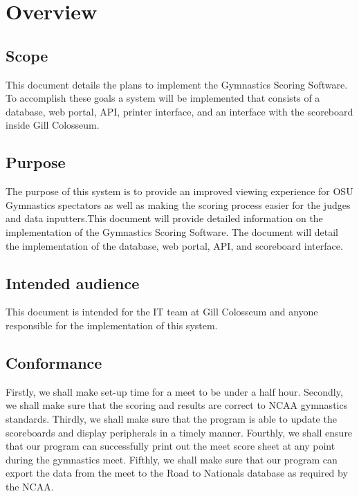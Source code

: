 \documentclass[letterpaper,10pt,draftclsnofoot,onecolumn,]{article}
\begin{document}
\section{Overview}
\subsection{Scope}
This document details the plans to implement the Gymnastics Scoring Software. To accomplish these goals a system will be implemented that consists of a database, web portal, API, printer interface, and an interface with the scoreboard inside Gill Colosseum. 
\subsection{Purpose}
The purpose of this system is to provide an improved viewing experience for OSU Gymnastics spectators as well as making the scoring process easier for the judges and data inputters.This document will provide detailed information on the implementation of the Gymnastics Scoring Software. The document will detail the implementation of the database, web portal, API, and scoreboard interface. 
\subsection{Intended audience}
This document is intended for the IT team at Gill Colosseum and anyone responsible for the implementation of this system. 

\subsection{Conformance}
Firstly, we shall make set-up time for a meet to be under a half hour. Secondly, we shall make sure that the scoring and results are correct to NCAA gymnastics standards. Thirdly, we shall make sure that the program is able to update the scoreboards and display peripherals in a timely manner. Fourthly, we shall ensure that our program can successfully print out the meet score sheet at any point during the gymnastics meet. Fifthly, we shall make sure that our program can export the data from the meet to the Road to Nationals database as required by the NCAA.

\end{document}
